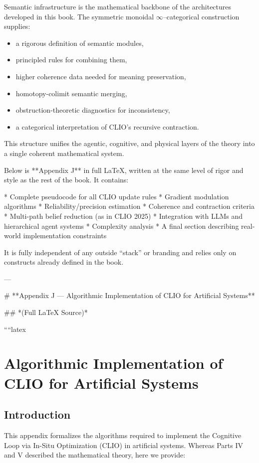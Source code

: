 \documentclass[12pt,oneside]{book}
\theoremstyle{plain}
\theoremstyle{definition}
\begin{document}
Semantic infrastructure is the mathematical backbone of the architectures developed in this book.  
The symmetric monoidal $\infty$--categorical construction supplies:

\begin{itemize}
  \item a rigorous definition of semantic modules,
  \item principled rules for combining them,
  \item higher coherence data needed for meaning preservation,
  \item homotopy-colimit semantic merging,
  \item obstruction-theoretic diagnostics for inconsistency,
  \item a categorical interpretation of CLIO's recursive contraction.
\end{itemize}

This structure unifies the agentic, cognitive, and physical layers of the theory into a single coherent mathematical system.

Below is **Appendix J** in full LaTeX, written at the same level of rigor and style as the rest of the book. It contains:

* Complete pseudocode for all CLIO update rules
* Gradient modulation algorithms
* Reliability/precision estimation
* Coherence and contraction criteria
* Multi-path belief reduction (as in CLIO 2025)
* Integration with LLMs and hierarchical agent systems
* Complexity analysis
* A final section describing real-world implementation constraints

It is fully independent of any outside “stack” or branding and relies only on constructs already defined in the book.

---

# **Appendix J — Algorithmic Implementation of CLIO for Artificial Systems**

## *(Full LaTeX Source)*

````latex
\chapter{Algorithmic Implementation of CLIO for Artificial Systems}
\label{app:clio_algorithms}

\section{Introduction}

This appendix formalizes the algorithms required to implement the
Cognitive Loop via In-Situ Optimization (CLIO) in artificial systems.
Whereas Parts IV and V described the mathematical theory, here we provide:
\end{document}
